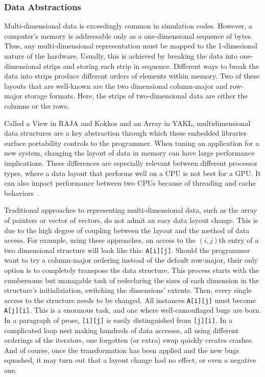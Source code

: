 \subsubsection{Data Abstractions}
Multi-dimensional data is exceedingly common in simulation codes.
However, a computer's memory is addressable only as a one-dimensional sequence of bytes.
Thus, any multi-dimensional representation must be mapped to the 1-dimesional nature of the hardware.
Usually, this is achieved by breaking the data into one-dimensional strips and storing each strip in sequence.
Different ways to break the data into strips produce different orders of elements within memory.
Two of these layouts that are well-known are the two dimensional column-major and row-major storage formats.
Here, the strips of two-dimensional data are either the columns or the rows.

Called a View in RAJA and Kokkos and an Array in YAKL, multidimensional data structures are a key abstraction through which these embedded libraries surface portability controls to the programmer.
When tuning an application for a new system, changing the layout of data in memory can have large performance implications.
These differences are especially relevant between different processor types, where a data layout that performs well on a CPU is not best for a GPU.
It can also impact performance between two CPUs because of threading and cache behaviors~\cite{trott2021kokkos}.

Traditional approaches to representing multi-dimensional data, such as the array of pointers or vector of vectors, do not admit an easy data layout change.
This is due to the high degree of coupling between the layout and the method of data access. 
For example, using these approaches, an access to the $(i,j)$th entry of a two dimensional structure will look like this: \verb.A[i][j]..
Should the programmer want to try a column-major ordering instead of the default row-major, their only option is to completely transpose the data structure.
This process starts with the cumbersome but managable task of redeclaring the sizes of each dimension in the structure's initializiation, switching the dimensions' extents.
Then, every single access to the structure needs to be changed. 
All instances \verb.A[i][j]. must become \verb.A[j][i]..
This is a enormous task, and one where well-camouflaged bugs are born. 
In a paragraph of prose, \verb.[i][j]. is easily distinguished from \verb.[j][i]..
In a complicated loop nest making hundreds of data accesses, all using different orderings of the iterators, one forgotten (or extra) swap quickly creates crashes.
And of course, once the transformation has been applied and the new bugs squashed, it may turn out that a layout change had no effect, or even a negative one.

